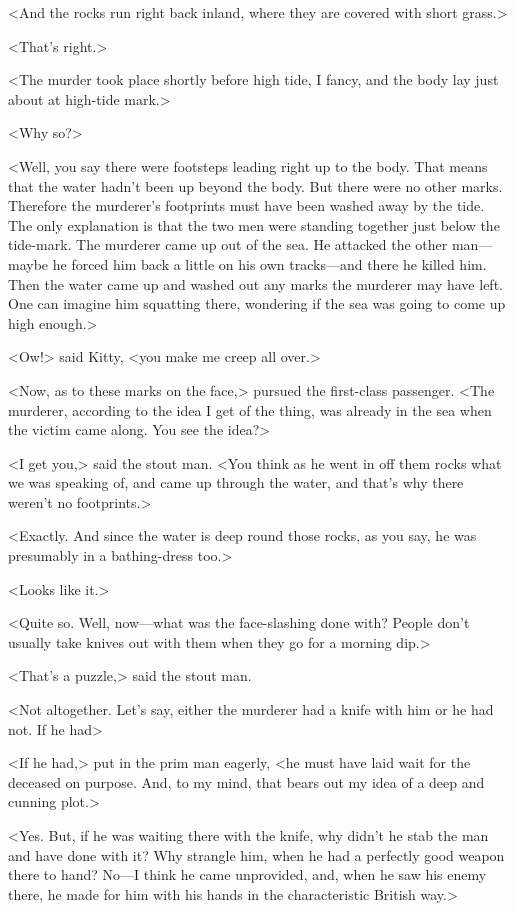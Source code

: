 <And the rocks run right back inland, where they are covered with short grass.>

<That's right.>

<The murder took place shortly before high tide, I fancy, and the body lay just about at high-tide mark.>

<Why so?>

<Well, you say there were footsteps leading right up to the body. That means that the water hadn't been up beyond the body. But there were no other marks. Therefore the murderer's footprints must have been washed away by the tide. The only explanation is that the two men were standing together just below the tide-mark. The murderer came up out of the sea. He attacked the other man—maybe he forced him back a little on his own tracks—and there he killed him. Then the water came up and washed out any marks the murderer may have left. One can imagine him squatting there, wondering if the sea was going to come up high enough.>

<Ow!> said Kitty, <you make me creep all over.>

<Now, as to these marks on the face,> pursued the first-class passenger. <The murderer, according to the idea I get of the thing, was already in the sea when the victim came along. You see the idea?>

<I get you,> said the stout man. <You think as he went in off them rocks what we was speaking of, and came up through the water, and that's why there weren't no footprints.>

<Exactly. And since the water is deep round those rocks, as you say, he was presumably in a bathing-dress too.>

<Looks like it.>

<Quite so. Well, now—what was the face-slashing done with? People don't usually take knives out with them when they go for a morning dip.>

<That's a puzzle,> said the stout man.

<Not altogether. Let's say, either the murderer had a knife with him or he had not. If he had\longdash>

<If he had,> put in the prim man eagerly, <he must have laid wait for the deceased on purpose. And, to my mind, that bears out my idea of a deep and cunning plot.>

<Yes. But, if he was waiting there with the knife, why didn't he stab the man and have done with it? Why strangle him, when he had a perfectly good weapon there to hand? No—I think he came unprovided, and, when he saw his enemy there, he made for him with his hands in the characteristic British way.>

